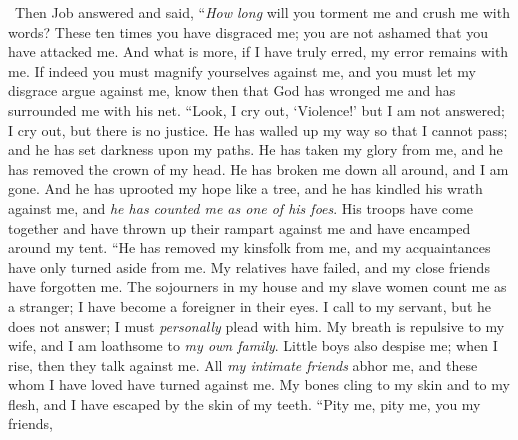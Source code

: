 \begin{biblechapter} %
  Then Job answered and said,
\verse “\textit{How long} will you torment me 
and crush me with words?
\verse These ten times you have disgraced me; 
you are not ashamed that you have attacked me.
\verse And what is more, if I have truly erred, 
my error remains with me.
\verse If indeed you must magnify yourselves against me, 
and you must let my disgrace argue against me,
\verse know then that God has wronged me 
and has surrounded me with his net.
\verse “Look, I cry out, ‘Violence!’ but I am not answered; 
I cry out, but there is no justice.
\verse He has walled up my way so that I cannot pass; 
and he has set darkness upon my paths.
\verse He has taken my glory from me, 
and he has removed the crown of my head.
\verse He has broken me down all around, and I am gone. 
And he has uprooted my hope like a tree,
\verse and he has kindled his wrath against me, 
and \textit{he has counted me as one of his foes}.
\verse His troops have come together 
and have thrown up their rampart against me 
and have encamped around my tent.
\verse “He has removed my kinsfolk from me, 
and my acquaintances have only turned aside from me.
\verse My relatives have failed, 
and my close friends have forgotten me.
\verse The sojourners in my house and my slave women count me as a stranger; 
I have become a foreigner in their eyes.
\verse I call to my servant, but he does not answer; 
I must \textit{personally} plead with him.
\verse My breath is repulsive to my wife, 
and I am loathsome to \textit{my own family}.
\verse Little boys also despise me; 
when I rise, then they talk against me.
\verse All \textit{my intimate friends} abhor me, 
and these whom I have loved have turned against me.
\verse My bones cling to my skin and to my flesh, 
and I have escaped by the skin of my teeth.
\verse “Pity me, pity me, you my friends, 

\end{biblechapter}
